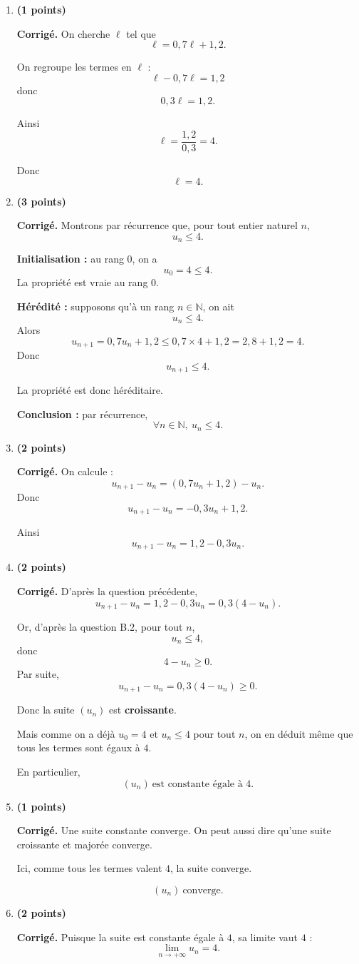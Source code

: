 \documentclass[11pt,a4paper]{article}
\newcommand{\N}{\mathbb{N}}
\newcommand{\bareme}[1]{\hfill{\color{blue!70!black}\textbf{(#1 points)}}}
\newcommand{\corr}{\noindent\textcolor{blue!70!black}{\textbf{Corrigé. }}}
\begin{document}
\begin{enumerate}[label=\textbf{B.\arabic*.}, leftmargin=0.9cm]

\item \bareme{1}

\corr On cherche $\ell$ tel que
\[
\ell=0{,}7\ell+1{,}2.
\]

On regroupe les termes en $\ell$ :
\[
\ell-0{,}7\ell=1{,}2
\]
donc
\[
0{,}3\ell=1{,}2.
\]

Ainsi
\[
\ell=\frac{1{,}2}{0{,}3}=4.
\]

Donc
\[
\boxed{\ell=4.}
\]

\item \bareme{3}

\corr Montrons par récurrence que, pour tout entier naturel $n$,
\[
u_n\leq 4.
\]

\textbf{Initialisation :} au rang $0$, on a
\[
u_0=4\leq 4.
\]
La propriété est vraie au rang $0$.

\textbf{Hérédité :} supposons qu’à un rang $n\in\N$, on ait
\[
u_n\leq 4.
\]
Alors
\[
u_{n+1}=0{,}7u_n+1{,}2\leq 0{,}7\times 4+1{,}2=2{,}8+1{,}2=4.
\]
Donc
\[
u_{n+1}\leq 4.
\]

La propriété est donc héréditaire.

\textbf{Conclusion :} par récurrence,
\[
\boxed{\forall n\in\N,\ u_n\leq 4.}
\]

\item \bareme{2}

\corr On calcule :
\[
u_{n+1}-u_n=(0{,}7u_n+1{,}2)-u_n.
\]
Donc
\[
u_{n+1}-u_n=-0{,}3u_n+1{,}2.
\]

Ainsi
\[
\boxed{u_{n+1}-u_n=1{,}2-0{,}3u_n.}
\]

\item \bareme{2}

\corr D’après la question précédente,
\[
u_{n+1}-u_n=1{,}2-0{,}3u_n=0{,}3(4-u_n).
\]

Or, d’après la question B.2, pour tout $n$,
\[
u_n\leq 4,
\]
donc
\[
4-u_n\geq 0.
\]
Par suite,
\[
u_{n+1}-u_n=0{,}3(4-u_n)\geq 0.
\]

Donc la suite $(u_n)$ est \textbf{croissante}.

Mais comme on a déjà $u_0=4$ et $u_n\leq 4$ pour tout $n$, on en déduit même que tous les termes sont égaux à $4$.

En particulier,
\[
\boxed{(u_n)\ \text{est constante égale à }4.}
\]

\item \bareme{1}

\corr Une suite constante converge. On peut aussi dire qu’une suite croissante et majorée converge.

Ici, comme tous les termes valent $4$, la suite converge.

\[
\boxed{(u_n)\ \text{converge}.}
\]

\item \bareme{2}

\corr Puisque la suite est constante égale à $4$, sa limite vaut $4$ :
\[
\boxed{\lim_{n\to+\infty}u_n=4.}
\]

\end{enumerate}
\end{document}
